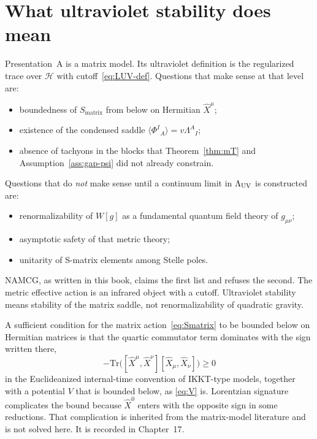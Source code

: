 \section{What ultraviolet stability does mean}
\label{sec:ch9-stability}

Presentation~A is a matrix model. Its ultraviolet definition is the
regularized trace over \(\mathcal{H}\) with cutoff~\eqref{eq:LUV-def}.
Questions that make sense at that level are:

\begin{itemize}
  \item boundedness of \(S_{\mathrm{matrix}}\) from below on Hermitian
        \(\hat X^\mu\);
  \item existence of the condensed saddle
        \(\langle\Phi^I{}_A\rangle=v\Lambda^A{}_I\);
  \item absence of tachyons in the blocks that Theorem~\ref{thm:mT}
        and Assumption~\ref{ass:gap-psi} did not already constrain.
\end{itemize}

Questions that do \emph{not} make sense until a continuum limit in
\(\Lambda_{\mathrm{UV}}\) is constructed are:

\begin{itemize}
  \item renormalizability of \(W[g]\) as a fundamental quantum field
        theory of \(g_{\mu\nu}\);
  \item asymptotic safety of that metric theory;
  \item unitarity of S-matrix elements among Stelle poles.
\end{itemize}

NAMCG, as written in this book, claims the first list and refuses
the second. The metric effective action is an infrared object with
a cutoff. Ultraviolet stability means stability of the matrix
saddle, not renormalizability of quadratic gravity.

A sufficient condition for the matrix action~\eqref{eq:Smatrix} to
be bounded below on Hermitian matrices is that the quartic
commutator term dominates with the sign written there,
\begin{equation}
  \label{eq:YM-bounded}
  -\mathrm{Tr}\bigl([\hat X^\mu,\hat X^\nu][\hat X_\mu,\hat X_\nu]\bigr)
  \ge 0
\end{equation}
in the Euclideanized internal-time convention of IKKT-type models,
together with a potential \(V\) that is bounded below, as
\eqref{eq:V} is. Lorentzian signature complicates the bound because
\(\hat X^0\) enters with the opposite sign in some reductions. That
complication is inherited from the matrix-model literature and is
not solved here. It is recorded in Chapter~17.

